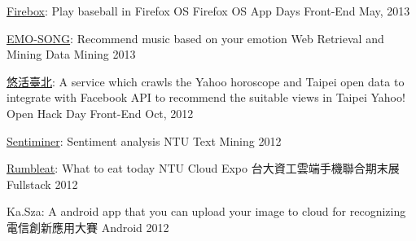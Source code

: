 \begin{cvhonors}
  \cvhonor
    {\href{http://firebox.herokuapp.com}{Firebox}: \textmd{Play baseball in Firefox OS}} %
    {Firefox OS App Days} %
    {Front-End} %
    {May, 2013} %


  \cvhonor
    {\href{http://emo-song.herokuapp.com}{EMO-SONG}: \textmd{Recommend music based on your emotion}} %
    {Web Retrieval and Mining} %
    {Data Mining} %
    {2013} %

  \cvhonor
    {\href{http://yoho-taipei.herokuapp.com}{悠活臺北}: \textmd{A service which crawls the Yahoo horoscope and Taipei open data to integrate with Facebook API to recommend the suitable views in Taipei}} %
    {Yahoo! Open Hack Day} %
    {Front-End} %
    {Oct, 2012} %

  \cvhonor
    {\href{https://sentiminer.herokuapp.com}{Sentiminer}: \textmd{Sentiment analysis}} %
    {NTU} %
    {Text Mining} %
    {2012} %

  \cvhonor
    {\href{http://rumbleat.herokuapp.com/}{Rumbleat}: \textmd{What to eat today}} %
    {NTU Cloud Expo 台大資工雲端手機聯合期末展} %
    {Fullstack} %
    {2012} %

  \cvhonor
    {Ka.Sza: \textmd{A android app that you can upload your image to cloud for recognizing}} %
    {電信創新應用大賽} %
    {Android} %
    {2012} %



\end{cvhonors}


